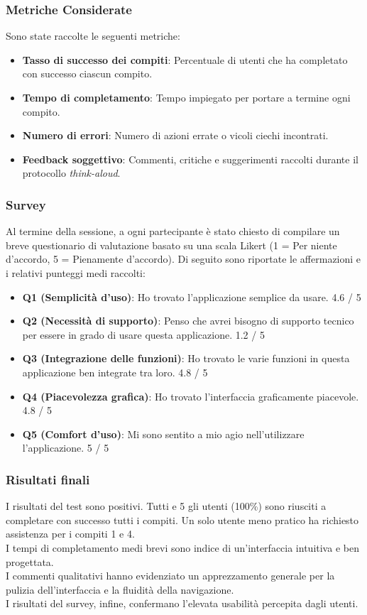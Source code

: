 \documentclass{book}
\begin{document}
\subsubsection{Metriche Considerate}
Sono state raccolte le seguenti metriche:
\begin{itemize}
    \item \textbf{Tasso di successo dei compiti}: Percentuale di utenti che ha completato con successo ciascun compito.
    \item \textbf{Tempo di completamento}: Tempo impiegato per portare a termine ogni compito.
    \item \textbf{Numero di errori}: Numero di azioni errate o vicoli ciechi incontrati.
    \item \textbf{Feedback soggettivo}: Commenti, critiche e suggerimenti raccolti durante il protocollo \textit{think-aloud}.
\end{itemize}

\subsubsection{Survey}
Al termine della sessione, a ogni partecipante è stato chiesto di compilare un breve questionario di valutazione basato su una scala Likert (1 = Per niente d'accordo, 5 = Pienamente d'accordo). Di seguito sono riportate le affermazioni e i relativi punteggi medi raccolti:
\begin{itemize}
    \item \textbf{Q1 (Semplicità d'uso)}: Ho trovato l'applicazione semplice da usare. 4.6 / 5
    \item \textbf{Q2 (Necessità di supporto)}: Penso che avrei bisogno di supporto tecnico per essere in grado di usare questa applicazione. 1.2 / 5 
    \item \textbf{Q3 (Integrazione delle funzioni)}: Ho trovato le varie funzioni in questa applicazione ben integrate tra loro. 4.8 / 5
    \item \textbf{Q4 (Piacevolezza grafica)}: Ho trovato l'interfaccia graficamente piacevole. 4.8 / 5
    \item \textbf{Q5 (Comfort d'uso)}: Mi sono sentito a mio agio nell'utilizzare l'applicazione. 5 / 5
\end{itemize}

\subsubsection{Risultati finali}
I risultati del test sono positivi. Tutti e 5 gli utenti (100\%) sono riusciti a completare con successo tutti i compiti. Un solo utente meno pratico ha richiesto assistenza per i compiti 1 e 4.\\
I tempi di completamento medi brevi sono indice di un'interfaccia intuitiva e ben progettata.\\
I commenti qualitativi hanno evidenziato un apprezzamento generale per la pulizia dell'interfaccia e la fluidità della navigazione.\\
I risultati del survey, infine, confermano l'elevata usabilità percepita dagli utenti.
\end{document}
